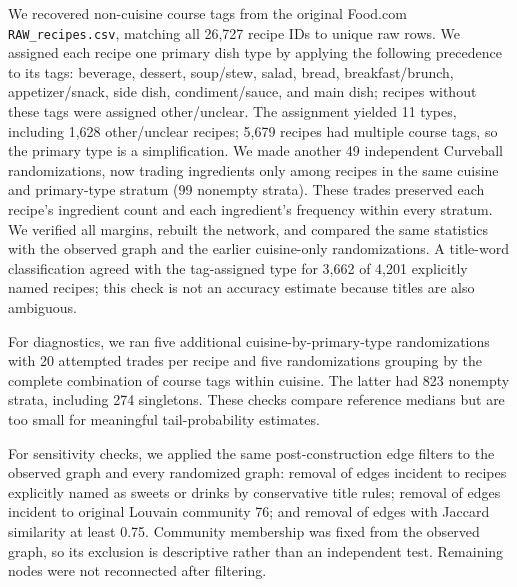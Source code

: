 We recovered non-cuisine course tags from the original Food.com \texttt{RAW\_recipes.csv}, matching all 26,727 recipe IDs to unique raw rows. We assigned each recipe one primary dish type by applying the following precedence to its tags: beverage, dessert, soup/stew, salad, bread, breakfast/brunch, appetizer/snack, side dish, condiment/sauce, and main dish; recipes without these tags were assigned other/unclear. The assignment yielded 11 types, including 1,628 other/unclear recipes; 5,679 recipes had multiple course tags, so the primary type is a simplification. We made another 49 independent Curveball randomizations, now trading ingredients only among recipes in the same cuisine and primary-type stratum (99 nonempty strata). These trades preserved each recipe's ingredient count and each ingredient's frequency within every stratum. We verified all margins, rebuilt the network, and compared the same statistics with the observed graph and the earlier cuisine-only randomizations. A title-word classification agreed with the tag-assigned type for 3,662 of 4,201 explicitly named recipes; this check is not an accuracy estimate because titles are also ambiguous.

For diagnostics, we ran five additional cuisine-by-primary-type randomizations with 20 attempted trades per recipe and five randomizations grouping by the complete combination of course tags within cuisine. The latter had 823 nonempty strata, including 274 singletons. These checks compare reference medians but are too small for meaningful tail-probability estimates.

For sensitivity checks, we applied the same post-construction edge filters to the observed graph and every randomized graph: removal of edges incident to recipes explicitly named as sweets or drinks by conservative title rules; removal of edges incident to original Louvain community 76; and removal of edges with Jaccard similarity at least 0.75. Community membership was fixed from the observed graph, so its exclusion is descriptive rather than an independent test. Remaining nodes were not reconnected after filtering.
